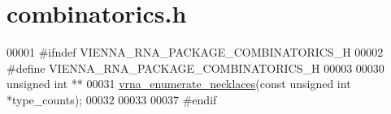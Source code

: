 \hypertarget{combinatorics_8h_source}{}\section{combinatorics.\+h}
\label{combinatorics_8h_source}

\begin{DoxyCode}
00001 \textcolor{preprocessor}{#ifndef VIENNA\_RNA\_PACKAGE\_COMBINATORICS\_H}
00002 \textcolor{preprocessor}{#define VIENNA\_RNA\_PACKAGE\_COMBINATORICS\_H}
00003 
00030 \textcolor{keywordtype}{unsigned} \textcolor{keywordtype}{int} **
00031 \hyperlink{group__utils_gae081ac655a76bd5c4b3d86c60b096b75}{vrna\_enumerate\_necklaces}(\textcolor{keyword}{const} \textcolor{keywordtype}{unsigned} \textcolor{keywordtype}{int} *type\_counts);
00032 
00033 
00037 \textcolor{preprocessor}{#endif}
\end{DoxyCode}
